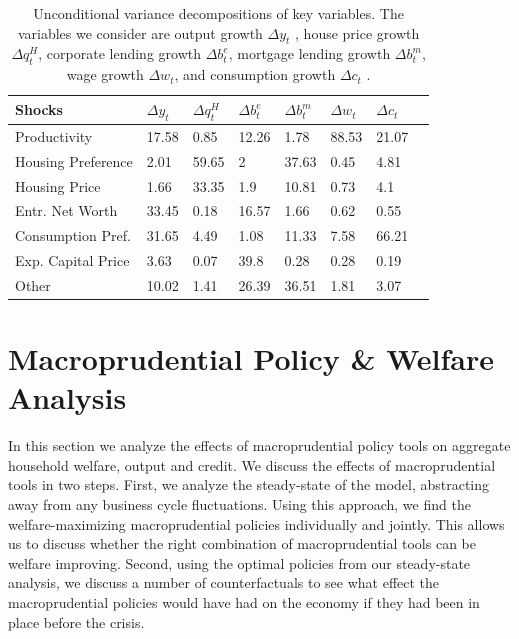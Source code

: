 \documentclass[12pt]{article}
\numberwithin{equation}{section}
\begin{document}
\begin{table}[H]
\caption{Unconditional variance decompositions of key variables. The variables we consider are output growth  $\Delta y_t$ , house price growth  $\Delta q^H_t$, corporate lending growth    $\Delta b^e_t$, mortgage lending growth    $\Delta b^m_t$, wage growth   $\Delta w_t$,  and consumption growth   $\Delta c_t$ . }
\label{uncond_var_decomp}
\begin{tabular}{l|lllllll}
Shocks& $\Delta y_t$ & $\Delta q^H_t$  & $\Delta b^e_t$  & $\Delta b^m_t$  & $\Delta w_t$   & $\Delta c_t$  &    \\
\hline
\hline
Productivity & 17.58 & 0.85 & 12.26 & 1.78 & 88.53 & 21.07 &  \\
Housing Preference & 2.01 & 59.65 & 2 & 37.63 & 0.45 &  4.81 &  \\
Housing Price & 1.66 & 33.35 & 1.9 & 10.81 & 0.73 & 4.1 &  \\
Entr. Net Worth & 33.45 & 0.18 & 16.57 & 1.66 & 0.62 &  0.55 &  \\
Consumption Pref. & 31.65 & 4.49 & 1.08 & 11.33 & 7.58 & 66.21 &  \\
Exp. Capital Price & 3.63 & 0.07 & 39.8 & 0.28 & 0.28 &  0.19 &  \\
Other & 10.02 & 1.41 & 26.39 & 36.51 & 1.81 & 3.07 & 
\end{tabular}
\end{table}

\FloatBarrier




\section{Macroprudential Policy \& Welfare Analysis}

In this section we analyze the effects of macroprudential policy tools on aggregate household welfare, output and credit. We discuss the effects of macroprudential tools in two steps. First, we analyze the steady-state of the model, abstracting away from any business cycle fluctuations.  Using this approach, we find the welfare-maximizing macroprudential policies individually and jointly. This allows us to discuss whether the right combination of macroprudential tools can be welfare improving.  Second, using the optimal policies from our steady-state analysis, we discuss a number of counterfactuals to see what effect the macroprudential policies would have had on the economy if they had been in place before the crisis. 
\end{document}
